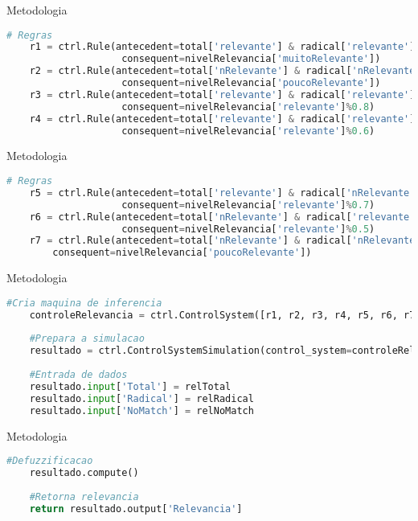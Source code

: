 \documentclass{beamer}
\begin{document}
	\begin{frame}[fragile]{Metodologia}
\begin{lstlisting}[language=Python, caption = Lógica Fuzzy(cont.)]	
	# Regras
	r1 = ctrl.Rule(antecedent=total['relevante'] & radical['relevante'] & noMatch['nRelevante'],
					consequent=nivelRelevancia['muitoRelevante'])
	r2 = ctrl.Rule(antecedent=total['nRelevante'] & radical['nRelevante'] & noMatch['relevante'],
					consequent=nivelRelevancia['poucoRelevante'])
	r3 = ctrl.Rule(antecedent=total['relevante'] & radical['relevante'] & noMatch['nRelevante'],
					consequent=nivelRelevancia['relevante']%0.8)
	r4 = ctrl.Rule(antecedent=total['relevante'] & radical['relevante'] & noMatch['relevante'],
					consequent=nivelRelevancia['relevante']%0.6)

\end{lstlisting}
	\end{frame}	

	\begin{frame}[fragile]{Metodologia}
\begin{lstlisting}[language=Python, caption = Lógica Fuzzy(cont.)]	
	# Regras
	r5 = ctrl.Rule(antecedent=total['relevante'] & radical['nRelevante'] & noMatch['nRelevante'],
					consequent=nivelRelevancia['relevante']%0.7)
	r6 = ctrl.Rule(antecedent=total['nRelevante'] & radical['relevante'] & noMatch['nRelevante'],
					consequent=nivelRelevancia['relevante']%0.5)
	r7 = ctrl.Rule(antecedent=total['nRelevante'] & radical['nRelevante'] & noMatch['nRelevante'],
		consequent=nivelRelevancia['poucoRelevante'])
\end{lstlisting}
	\end{frame}	

	\begin{frame}[fragile]{Metodologia}
\begin{lstlisting}[language=Python, caption = Lógica Fuzzy(cont.)]	
	#Cria maquina de inferencia
	controleRelevancia = ctrl.ControlSystem([r1, r2, r3, r4, r5, r6, r7])
	
	#Prepara a simulacao
	resultado = ctrl.ControlSystemSimulation(control_system=controleRelevancia)
	
	#Entrada de dados
	resultado.input['Total'] = relTotal
	resultado.input['Radical'] = relRadical
	resultado.input['NoMatch'] = relNoMatch
\end{lstlisting}
	\end{frame}	

	\begin{frame}[fragile]{Metodologia}
\begin{lstlisting}[language=Python, caption = Lógica Fuzzy(cont.)]	
	#Defuzzificacao
	resultado.compute()
	
	#Retorna relevancia
	return resultado.output['Relevancia']
\end{lstlisting}
	\end{frame}
\end{document}
